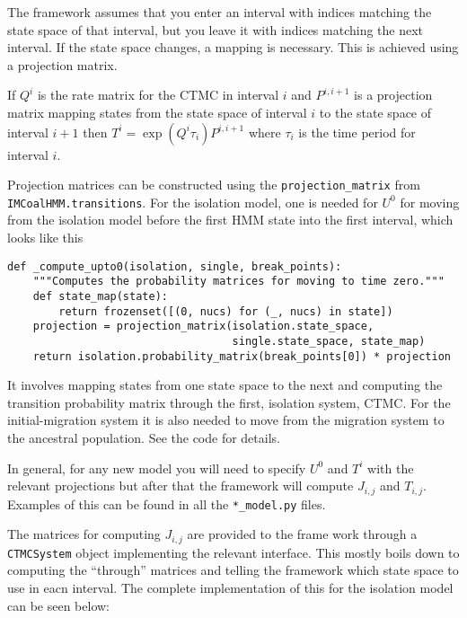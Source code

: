 \documentclass[11pt]{article}
\begin{document}
The framework assumes that you enter an interval with indices matching the state space of that interval, but you leave it with indices matching the next interval. If the state space changes, a mapping is necessary. This is achieved using a projection matrix.

If $Q^i$ is the rate matrix for the CTMC in interval $i$ and $P^{i,i+1}$ is a projection matrix mapping states from the state space of interval $i$ to the state space of interval $i+1$ then $T^i = \exp(Q^i\tau_i)P^{i,i+1}$ where $\tau_i$ is the time period for interval $i$.

Projection matrices can be constructed using the \texttt{projection\_matrix} from \texttt{IMCoalHMM.transitions}. For the isolation model, one is needed for $U^0$ for moving from the isolation model before the first HMM state into the first interval, which looks like this

\begin{verbatim}
def _compute_upto0(isolation, single, break_points):
    """Computes the probability matrices for moving to time zero."""
    def state_map(state):
        return frozenset([(0, nucs) for (_, nucs) in state])
    projection = projection_matrix(isolation.state_space, 
                                   single.state_space, state_map)
    return isolation.probability_matrix(break_points[0]) * projection
\end{verbatim}

It involves mapping states from one state space to the next and computing the transition probability matrix through the first, isolation system, CTMC. For the initial-migration system it is also needed to move from the migration system to the ancestral population. See the code for details.

In general, for any new model you will need to specify $U^0$ and $T^i$ with the relevant projections but after that the framework will compute $J_{i,j}$ and $T_{i,j}$. Examples of this can be found in all the \texttt{*\_model.py} files.

The matrices for computing $J_{i,j}$ are provided to the frame work through a \texttt{CTMCSystem} object implementing the relevant interface. This mostly boils down to computing the ``through'' matrices and telling the framework which state space to use in eacn interval. The complete implementation of this for the isolation model can be seen below:
\end{document}
